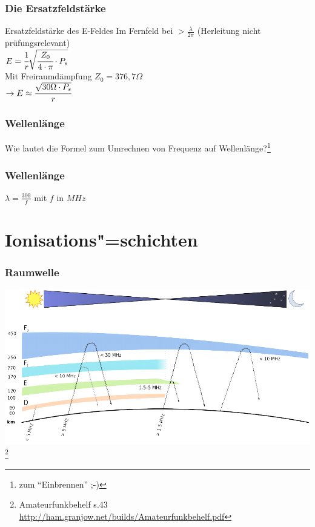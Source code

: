\begin{frame}
    \frametitle{Die Ersatzfeldstärke}
    \begin{block}{Ersatzfeldstärke des E-Feldes}
        Im Fernfeld bei $> \frac{\lambda}{2\pi}$ (Herleitung nicht prüfungsrelevant)\\[1em]
    	$E = \cfrac{1}{r} \sqrt{\cfrac{Z_0}{4 \cdot \pi} \cdot P_s}$ \\[1em]
        Mit Freiraumdämpfung $Z_0 = 376,7 \Omega $\\[1em]
    	$\rightarrow E \approx \cfrac{\sqrt{30 \Omega \cdot P_s}}{r} $ \\[1em]
  \end{block}
\end{frame}


\begin{frame}
    \frametitle{Wellenlänge}
    \begin{center}
        \huge Wie lautet die Formel zum Umrechnen von Frequenz auf
        Wellenlänge?\footnote{zum ``Einbrennen'' ;-)}
    \end{center}
\end{frame}

\begin{frame}
    \frametitle{Wellenlänge}
    \begin{center}
        \huge $\lambda = \frac{300}{f}$ mit $f$ in $MHz$
    \end{center}
\end{frame}

\section*{Ionisations"=schichten}

\begin{frame}
    \frametitle{Raumwelle}
	\begin{center}
        \includegraphics[width=.9\textwidth,height=.85\textheight,keepaspectratio]{a08/schichten_behelf_43.png}
        \footnote{\tiny Amateurfunkbehelf s.43 \url{http://ham.granjow.net/builds/Amateurfunkbehelf.pdf}}
    \end{center}
\end{frame}

